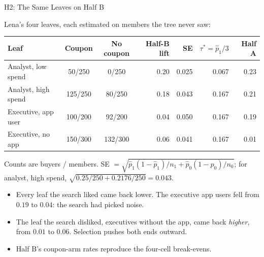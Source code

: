 \documentclass[aspectratio=169, 11pt, handout]{beamer}
\begin{document}
\begin{frame}{H2: The Same Leaves on Half B}

Lena's four leaves, each estimated on members the tree never saw:

\begin{center}
\small
\begin{tabular}{lccrrrr}
\toprule
\textbf{Leaf} & \textbf{Coupon} & \textbf{No coupon} & \textbf{Half-B lift} & \textbf{SE} & $\tau^\ast = \hat p_1/3$ & \textbf{Half A} \\
\midrule
Analyst, low spend & 50/250 & 0/250 & 0.20 & 0.025 & 0.067 & 0.23 \\
Analyst, high spend & 125/250 & 80/250 & 0.18 & 0.043 & 0.167 & 0.21 \\
Executive, app user & 100/200 & 92/200 & 0.04 & 0.050 & 0.167 & 0.19 \\
Executive, no app & 150/300 & 132/300 & 0.06 & 0.041 & 0.167 & 0.01 \\
\bottomrule
\end{tabular}
\end{center}

\small Counts are buyers / members. SE $= \sqrt{\hat p_1(1-\hat p_1)/n_1 + \hat p_0(1-\hat p_0)/n_0}$; for analyst, high spend, $\sqrt{0.25/250 + 0.2176/250} = 0.043$.

\normalsize
\bigskip

\begin{itemize}
  \item Every leaf the search liked came back lower. The executive app users fell from $0.19$ to $0.04$: the search had picked noise.
  \item The leaf the search disliked, executives without the app, came back \emph{higher}, from $0.01$ to $0.06$. Selection pushes both ends outward.
  \item Half B's coupon-arm rates reproduce the four-cell break-evens.
\end{itemize}
\end{frame}
\end{document}
